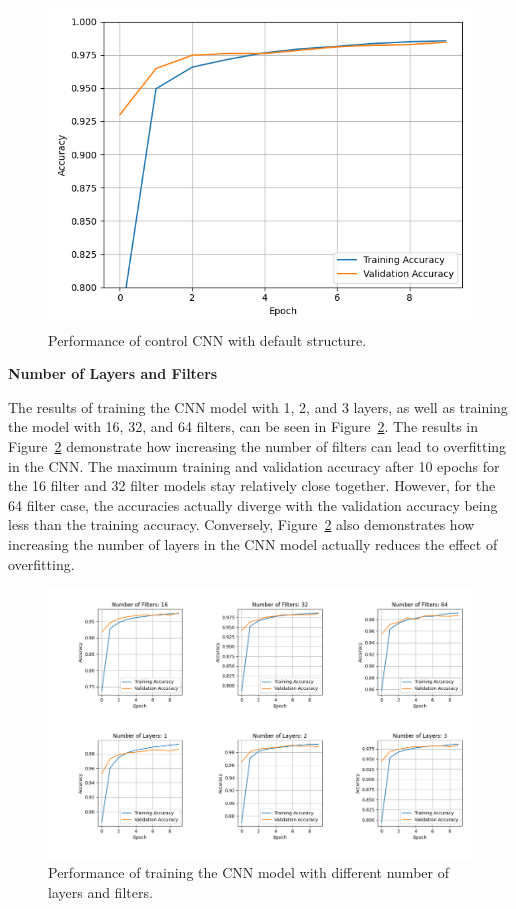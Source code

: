 \documentclass[a4paper]{article}
\begin{document}
\begin{figure}[h!]
    \centering
    \includegraphics[scale=0.45]{images/control-cnn.png}
    \caption{Performance of control CNN with default structure.}
    \label{fig:control-cnn}
\end{figure}

\textbf{Number of Layers and Filters}

The results of training the CNN model with 1, 2, and 3 layers, as well as training the model with 16, 32, and 64 filters, can be seen in Figure~\ref{fig:layers-filters}. The results in Figure~\ref{fig:layers-filters} demonstrate how increasing the number of filters can lead to overfitting in the CNN. The maximum training and validation accuracy after 10 epochs for the 16 filter and 32 filter models stay relatively close together. However, for the 64 filter case, the accuracies actually diverge with the validation accuracy being less than the training accuracy. Conversely, Figure~\ref{fig:layers-filters} also demonstrates how increasing the number of layers in the CNN model actually reduces the effect of overfitting.

\begin{figure}[h!]
    \centering
    \includegraphics[scale=0.4]{images/n-layers-n-filters-cnn.png}
    \caption{Performance of training the CNN model with different number of layers and filters.}
    \label{fig:layers-filters}
\end{figure}
\end{document}

